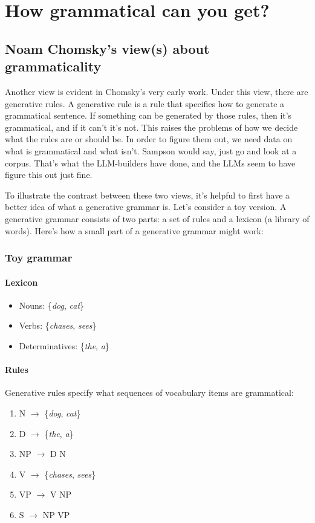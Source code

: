 \chapter{How grammatical can you get?}

\section{Noam Chomsky's view(s) about grammaticality}
Another view is evident in Chomsky's very early work. Under this view, there are generative rules. A generative rule is a rule that specifies how to generate a grammatical sentence. If something can be generated by those rules, then it's grammatical, and if it can't it's not. This raises the problems of how we decide what the rules are or should be. In order to figure them out, we need data on what is grammatical and what isn't. Sampson would say, just go and look at a corpus. That's what the LLM-builders have done, and the LLMs seem to have figure this out just fine.

To illustrate the contrast between these two views, it's helpful to first have a better idea of what a generative grammar is. Let's consider a toy version. A generative grammar consists of two parts: a set of rules and a lexicon (a library of words). Here's how a small part of a generative grammar might work:

\subsection{Toy grammar}

\subsubsection*{Lexicon}
\begin{itemize}
 \item Nouns: \{\textit{dog}, \textit{cat}\}
 \item Verbs: \{\textit{chases}, \textit{sees}\}
 \item Determinatives: \{\textit{the}, \textit{a}\}
\end{itemize}

\subsubsection*{Rules}
Generative rules specify what sequences of vocabulary items are grammatical:

\begin{enumerate}
 \item N \(\rightarrow\) \{\textit{dog}, \textit{cat}\}
 \item D \(\rightarrow\) \{\textit{the}, \textit{a}\}
 \item NP \(\rightarrow\) D N
 \item V \(\rightarrow\) \{\textit{chases}, \textit{sees}\}
 \item VP \(\rightarrow\) V NP
 \item S \(\rightarrow\) NP VP
\end{enumerate}

